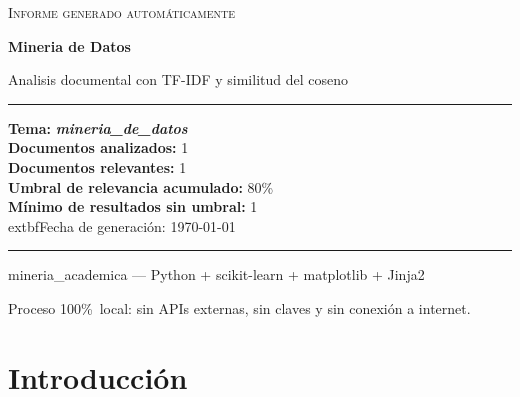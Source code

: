 \documentclass[11pt,a4paper]{article}
\newcommand{\tema}[1]{\textbf{\textit{#1}}}
\newcommand{\pcento}{\%}
\begin{document}
\begin{titlepage}
  \centering
  \vspace*{2.0cm}

  {\Large\textsc{Informe generado automáticamente}\par}
  \vspace{0.7cm}
  {\huge\bfseries Mineria de Datos\par}
  \vspace{0.4cm}
  {\large Analisis documental con TF-IDF y similitud del coseno\par}

  \vspace{1.8cm}

  \begin{minipage}{0.92\textwidth}
    \hrule
    \vspace{0.4cm}
    {\small
    \textbf{Tema:} \tema{ mineria\_de\_datos }\\[4pt]
    \textbf{Documentos analizados:} 1\\
    \textbf{Documentos relevantes:} 1\\
    \textbf{Umbral de relevancia acumulado:} 80\pcento\\
    \textbf{Mínimo de resultados sin umbral:} 1\\
      	extbf{Fecha de generación:} \today
    \par}
    \vspace{0.4cm}
    \hrule
  \end{minipage}

  \vfill

  {\small mineria\_academica --- Python + scikit-learn + matplotlib + Jinja2\par}
  {\footnotesize
   Proceso 100\pcento\ local: sin APIs externas, sin claves y sin conexión
   a internet.\par}
\end{titlepage}

\tableofcontents
\newpage

\section{Introducción}
\label{sec:introduccion}
\end{document}
